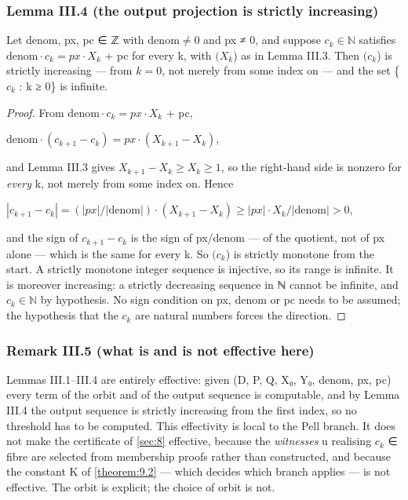 \documentclass[11pt]{article}
\theoremstyle{plain}
\theoremstyle{definition}
\theoremstyle{remark}
\theoremstyle{plain}
\theoremstyle{definition}
\theoremstyle{remark}
\theoremstyle{plain}
\theoremstyle{definition}
\theoremstyle{remark}
\begin{document}
\subsubsection*{Lemma III.4 (the output projection is strictly increasing)}
Let denom, px, pc ∈ ℤ with $\mathrm{denom} ≠ 0$ and px ≠ 0, and suppose $c_{k} ∈ ℕ$ satisfies $\mathrm{denom}·c_{k} = px·X_{k}$ + pc for every k, with $(X_{k}$) as in Lemma III.3. Then $(c_{k}$) is strictly increasing — from $k = 0$, not merely from some index on — and the set \{$c_{k}$ : k ≥ 0\} is infinite.

\begin{proof}
From $\mathrm{denom}·c_{k} = px·X_{k}$ + pc,

$\mathrm{denom}·(c_{k+1} − c_{k}) = px·(X_{k+1} − X_{k})$,

and Lemma III.3 gives $X_{k+1} − X_{k} ≥ X_{k} ≥ 1$, so the right-hand side is nonzero for \emph{every} k, not merely from some index on. Hence

$|c_{k+1} − c_{k}| = (|px|/|\mathrm{denom}|)·(X_{k+1} − X_{k}) ≥ |px|·X_{k}/|\mathrm{denom}| > 0$,

and the sign of $c_{k+1} − c_{k}$ is the sign of px/denom — of the quotient, not of px alone — which is the same for every k. So $(c_{k}$) is strictly monotone from the start. A strictly monotone integer sequence is injective, so its range is infinite. It is moreover increasing: a strictly decreasing sequence in ℕ cannot be infinite, and $c_{k} ∈ ℕ$ by hypothesis. No sign condition on px, denom or pc needs to be assumed; the hypothesis that the $c_{k}$ are natural numbers forces the direction.

\end{proof}
\subsubsection*{Remark III.5 (what is and is not effective here)}
Lemmas III.1–III.4 are entirely effective: given (D, P, Q, X₀, Y₀, denom, px, pc) every term of the orbit and of the output sequence is computable, and by Lemma III.4 the output sequence is strictly increasing from the first index, so no threshold has to be computed. This effectivity is local to the Pell branch. It does not make the certificate of \cref{sec:8} effective, because the \emph{witnesses} u realising $c_{k}$ ∈ fibre are selected from membership proofs rather than constructed, and because the constant K of \cref{theorem:9.2} — which decides which branch applies — is not effective. The orbit is explicit; the choice of orbit is not.
\end{document}
